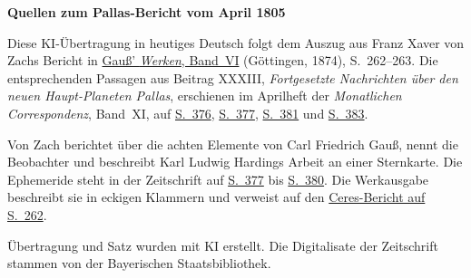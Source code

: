 \clearpage\thispagestyle{empty}
\begin{center}\textbf{Quellen zum Pallas-Bericht vom April 1805}\end{center}
\noindent Diese KI-Übertragung in heutiges Deutsch folgt dem Auszug aus Franz Xaver von Zachs Bericht in \href{https://gdz.sub.uni-goettingen.de/id/PPN236007467}{Gauß’ \textit{Werken}, Band~VI} (Göttingen, 1874), S.~262--263. Die entsprechenden Passagen aus Beitrag XXXIII, \textit{Fortgesetzte Nachrichten über den neuen Haupt-Planeten Pallas}, erschienen im Aprilheft der \textit{Monatlichen Correspondenz}, Band~XI, auf \href{https://www.digitale-sammlungen.de/en/view/bsb10538603?page=388}{S.~376}, \href{https://www.digitale-sammlungen.de/en/view/bsb10538603?page=389}{S.~377}, \href{https://www.digitale-sammlungen.de/en/view/bsb10538603?page=393}{S.~381} und \href{https://www.digitale-sammlungen.de/en/view/bsb10538603?page=395}{S.~383}.
\par\smallskip\noindent Von Zach berichtet über die achten Elemente von Carl Friedrich Gauß, nennt die Beobachter und beschreibt Karl Ludwig Hardings Arbeit an einer Sternkarte. Die Ephemeride steht in der Zeitschrift auf \href{https://www.digitale-sammlungen.de/en/view/bsb10538603?page=389}{S.~377} bis \href{https://www.digitale-sammlungen.de/en/view/bsb10538603?page=392}{S.~380}. Die Werkausgabe beschreibt sie in eckigen Klammern und verweist auf den \hyperlink{native-267}{Ceres-Bericht auf S.~262}.
\par\smallskip\noindent Übertragung und Satz wurden mit KI erstellt. Die Digitalisate der Zeitschrift stammen von der Bayerischen Staatsbibliothek.
\clearpage
